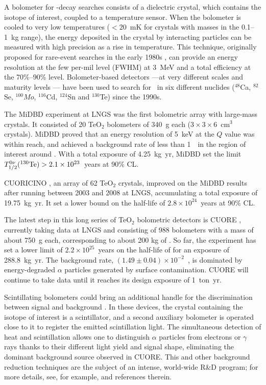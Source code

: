 %
A bolometer for \bbonu-decay searches consists of a dielectric crystal, which contains the isotope of interest, coupled to a temperature sensor. When the bolometer is cooled to very low temperatures ($<20$~mK for crystals with masses in the 0.1--1~kg range), the energy deposited in the crystal by interacting particles can be measured with high precision as a rise in temperature. This technique, originally proposed for rare-event searches in the early 1980s \cite{Fiorini:1983yj}, can provide an energy resolution at the few per-mil level (FWHM) at 3~MeV and a total efficiency at the 70\%--90\% level. Bolometer-based detectors ---\thinspace at very different scales and maturity levels \thinspace--- have been used to search for \bbonu\ in six different nuclides ($^{48}$Ca, $^{82}$Se, $^{100}Mo$, $^{116}$Cd, $^{124}$Sn and $^{130}$Te) since the 1990s.

The MiDBD experiment \cite{Arnaboldi:2002te} at LNGS was the first bolometric array with large-mass crystals. It consisted of 20 TeO$_2$ bolometers of 340~g each ($3\times3\times6$~cm$^3$ crystals). MiDBD proved that an energy resolution of 5~keV at the $Q$ value was within reach, and achieved a background rate of less than 1~\ckky\ in the region of interest around \Qbb. With a total exposure of 4.25~kg~yr, MiDBD set the limit $T_{1/2}^{0\nu}(^{130}\mathrm{Te}) > 2.1\times10^{23}$~years at 90\% CL. 

CUORICINO \cite{Andreotti:2010vj}, an array of 62 TeO$_2$ crystals, improved on the MiDBD results after running between 2003 and 2008 at LNGS, accumulating a total exposure of 19.75~kg~yr. It set a lower bound on the  half-life of $2.8\times10^{24}$~years at 90\% CL. 

The latest step in this long series of TeO$_2$ bolometric detectors is CUORE \cite{CUORE:2021mvw}, currently taking data at LNGS and consisting of 988 bolometers with a mass of about 750~g each, corresponding to about 200 kg of . So far, the experiment has set a lower limit of $2.2\times10^{25}$~years on the half-life of  for an exposure of 288.8~kg~yr. The background rate, $(1.49\pm0.04)\times 10^{-2}$~\ckky, is dominated by energy-degraded $\alpha$ particles generated by surface contamination. CUORE will continue to take data until it reaches its design  exposure of 1~ton~yr. 

Scintillating bolometers could bring an additional handle for the discrimination between signal and background \cite{Pirro:2005ar}. In these devices, the crystal containing the isotope of interest is a scintillator, and a second auxiliary bolometer is operated close to it to register the emitted scintillation light. The simultaneous detection of heat and scintillation allows one to distinguish $\alpha$ particles from electrons or $\gamma$ rays thanks to their different light yield and signal shape, eliminating the dominant background source observed in CUORE. This and other background reduction techniques are the subject of an intense, world-wide R\&D program; for more details, see, for example, \cite{Zolotarova:2021inw} and references therein.

